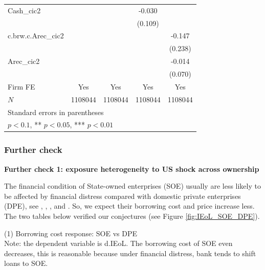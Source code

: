 \documentclass[12pt]{article}
\begin{document}
\begin{center}
\begin{tabular}{l*{4}{c}}
\addlinespace
Cash\_cic2   &                     &                     &      -0.030         &                     \\
            &                     &                     &     (0.109)         &                     \\
\addlinespace
c.brw.c.Arec\_cic2&                     &                     &                     &      -0.147         \\
            &                     &                     &                     &     (0.238)         \\
\addlinespace
Arec\_cic2   &                     &                     &                     &      -0.014         \\
            &                     &                     &                     &     (0.070)         \\
\addlinespace
Firm FE     &         Yes         &         Yes         &         Yes         &         Yes         \\
\midrule
\(N\)       &     1108044         &     1108044         &     1108044         &     1108044         \\
\bottomrule
\multicolumn{5}{l}{\footnotesize Standard errors in parentheses}\\
\multicolumn{5}{l}{\footnotesize * \(p<0.1\), ** \(p<0.05\), *** \(p<0.01\)}\\
\end{tabular}

\end{center}

\subsubsection{Further check}
 
\textbf{Further check 1: exposure heterogeneity to US shock across ownership}

The financial condition of State-owned enterprises (SOE) usually are less likely to be affected by financial distress compared with domestic private enterprises (DPE), see \cite{boyreau2005pitfalls}, \cite{dollar2007wasted}, \cite{riedel2007overview}, and \cite{song2011growing}. So, we expect their borrowing cost and price increase less.  The two tables below verified our conjectures (see Figure \ref{fig:IEoL_SOE_DPE}).

(1) Borrowing cost response: SOE vs DPE \\
Note: the dependent variable is d.IEoL. The borrowing cost of SOE even decreases, this is reasonable because under financial distress, bank tends to shift loans to SOE.
\end{document}
